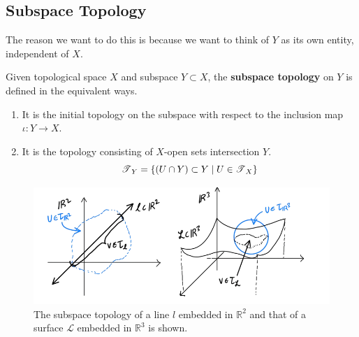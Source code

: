 \subsection{Subspace Topology} 

  The reason we want to do this is because we want to think of $Y$ as its own entity, independent of $X$. 

  \begin{theorem}
    Given topological space $X$ and subspace $Y \subset X$, the \textbf{subspace topology} on $Y$ is defined in the equivalent ways. 
    \begin{enumerate}
      \item It is the initial topology on the subspace with respect to the inclusion map $\iota: Y \rightarrow X$. 
      \item It is the topology consisting of $X$-open sets intersection $Y$. 
      \begin{equation}
        \operatorname{\mathscr{T}}_Y = \{(U \cap Y) \subset Y \mid U \in \operatorname{\mathscr{T}}_X\}
      \end{equation}
    \end{enumerate}

    \begin{figure}[H]
      \centering 
      \includegraphics[scale=0.4]{img/Subspace_Topology.png}
      \caption{The subspace topology of a line $l$ embedded in $\mathbb{R}^2$ and that of a surface $\mathcal{L}$ embedded in $\mathbb{R}^3$ is shown.}
      \label{fig:subspace_topology}
    \end{figure} 
  \end{theorem} 
